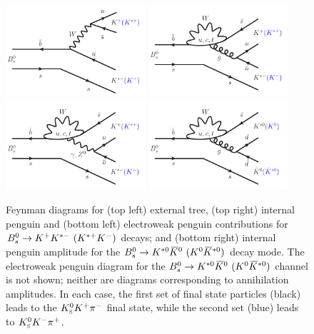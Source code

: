 \begin{figure}[!tb]
  \centering
  \includegraphics*[width=0.46\textwidth]{figs/Generic_Bs2KstK_tree_ext}
  \includegraphics*[width=0.46\textwidth]{figs/Generic_Bs2KstK_loop}
  \includegraphics*[width=0.46\textwidth]{figs/Generic_Bs2KstK_loop_EW}
  \includegraphics*[width=0.46\textwidth]{figs/Generic_Bs2KsKz_loop}
  \caption{\small
    Feynman diagrams for (top left) external tree, (top right) internal penguin and 
    (bottom left) electroweak penguin contributions for ${{B}^0_{s}} \rightarrow {\ensuremath{{K}^+}}{\ensuremath{{K}^{*-}}}~({{K}^{*+}}{{K}^-})$ decays; and 
    (bottom right) internal penguin amplitude for the ${{B}^0_{s}} \rightarrow {\ensuremath{{K}^{*0}}}{\ensuremath{{\kern 0.2em\overline{\kern -0.2em K}{}}{}^0}}~({{K}^0}{{\kern 0.2em\overline{\kern -0.2em K}{}}{}^{*0}})$ decay mode. 
    The electroweak penguin diagram for the ${{B}^0_{s}} \rightarrow {\ensuremath{{K}^{*0}}}{\ensuremath{{\kern 0.2em\overline{\kern -0.2em K}{}}{}^0}}~({{K}^0}{{\kern 0.2em\overline{\kern -0.2em K}{}}{}^{*0}})$ channel is not shown; neither are diagrams corresponding to annihilation amplitudes. 
    In each case, the first set of final state particles (black) leads to the ${{K}^0_{\mathrm{ \scriptscriptstyle S}}}{{K}^+}{{\pi}^-}$ final state, while the second set (blue) leads to ${{K}^0_{\mathrm{ \scriptscriptstyle S}}}{{K}^-}{{\pi}^+}$.
  }
  \label{fig:feynman}
\end{figure}
  
